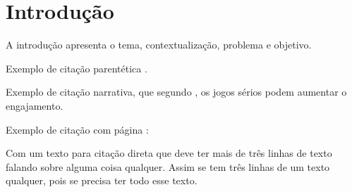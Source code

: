 \section{Introdução}\label{sec:introducao}

A introdução apresenta o tema, contextualização, problema e objetivo.  

Exemplo de citação parentética \parencite{albuquerqueToyUserInterfaces2021}.  

Exemplo de citação narrativa, que segundo
\textcite{aragaoEnsinoProgramacaoPensamento2023}, os jogos sérios podem aumentar
o engajamento.

Exemplo de citação com página
\cite[p.~25]{azumaRecentAdvancesAugmentedReality2001}:
\begin{displayquote}
\small
Com um texto para citação direta que deve ter mais de três linhas de texto
falando sobre alguma coisa qualquer. Assim se tem três linhas de um texto
qualquer, pois se precisa ter todo esse texto.
\end{displayquote}
